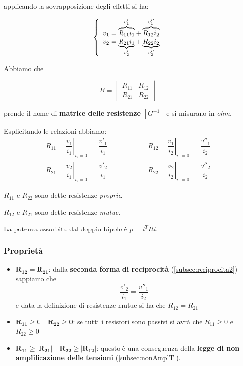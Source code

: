 \documentclass[a4paper]{report}
\begin{document}
applicando la sovrapposizione degli effetti si ha:

\[
\left\{
\begin{array}{l l}
  v_1=\overbrace{R_{11}i_1}^{v'_1}+\overbrace{R_{12}i_2}^{v''_1}\\
  v_2=\underbrace{R_{21}i_1}_{v'_2}+\underbrace{R_{22}i_2}_{v''_2}
\end{array}\right.
\]

Abbiamo che

\[
R=
\begin{vmatrix}
  R_{11} & R_{12}\\
  R_{21} & R_{22}
\end{vmatrix}
\]

prende il nome di {\bf matrice delle resistenze} $[G^{-1}]$ e si
misurano in \emph{ohm}.

Esplicitando le relazioni abbiamo:
\[
\begin{matrix}
  R_{11}=\left. \dfrac{v_1}{i_1}\right|_{i_2=0} \ =\dfrac{v'_1}{i_1} &
  \quad \quad \quad \quad \quad
  R_{12}=\left. \dfrac{v_1}{i_2}\right|_{i_1=0} \ =\dfrac{v''_1}{i_2}\\[.5cm]
  R_{21}=\left. \dfrac{v_2}{i_1}\right|_{i_2=0} \ =\dfrac{v'_2}{i_1} &
  \quad \quad \quad \quad \quad
  R_{22}=\left. \dfrac{v_2}{i_2}\right|_{i_1=0} \ =\dfrac{v''_2}{i_2}
\end{matrix}
\]

$R_{11}$ e $R_{22}$ sono dette resistenze \emph{proprie}.

$R_{12}$ e $R_{21}$ sono dette resistenze \emph{mutue}.

\vspace{0.5cm}
La potenza assorbita dal doppio bipolo \`e $p=i^TRi$.

\subsubsection{Propriet\`a}

\begin{itemize}
  \item $\mathbf{R_{12}=R_{21}}$: dalla {\bf seconda forma di
    reciprocit\`a} (\ref{subsec:reciprocita2}) sappiamo che
    \[
    \dfrac{v'_2}{i_1}=\dfrac{v''_1}{i_2}
    \]
    e data la definizione di resistenze mutue si ha che
    $R_{12}=R_{21}$
  \item $\mathbf{R_{11} \geq 0 \quad R_{22}\geq 0}$: se tutti i
    resistori sono passivi si avr\`a che $R_{11} \geq 0$ e $R_{22}\geq
    0$.
  \item $\mathbf{R_{11} \geq |R_{21}| \quad R_{22} \geq |R_{12}|}$:
    questo \`e una conseguenza della {\bf legge di non amplificazione
      delle tensioni} (\ref{subsec:nonAmplT}).
\end{itemize}
\end{document}
